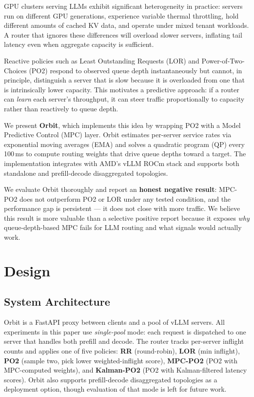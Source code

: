 \documentclass[blind]{gtac}
\begin{document}
GPU clusters serving LLMs exhibit significant heterogeneity in practice:
servers run on different GPU generations, experience variable thermal
throttling, hold different amounts of cached KV data, and operate under
mixed tenant workloads. A router that ignores these differences will
overload slower servers, inflating tail latency even when aggregate capacity
is sufficient.

Reactive policies such as Least Outstanding Requests (LOR) and
Power-of-Two-Choices (PO2) \cite{po2} respond to observed queue depth
instantaneously but cannot, in principle, distinguish a server that is
slow because it is overloaded from one that is intrinsically lower capacity.
This motivates a predictive approach: if a router can \emph{learn} each
server's throughput, it can steer traffic proportionally to capacity rather
than reactively to queue depth.

We present \textbf{Orbit}, which implements this idea by wrapping PO2 with
a Model Predictive Control (MPC) \cite{mpc_book} layer. Orbit estimates
per-server service rates via exponential moving averages (EMA) and solves a
quadratic program (QP) every 100\,ms to compute routing weights that drive
queue depths toward a target. The implementation integrates with AMD's vLLM
ROCm stack and supports both standalone and prefill-decode disaggregated
topologies.

We evaluate Orbit thoroughly and report an \textbf{honest negative result}:
MPC-PO2 does not outperform PO2 or LOR under any tested condition, and
the performance gap is persistent --- it does not close with more traffic.
We believe this result is more valuable than a selective positive report
because it exposes \emph{why} queue-depth-based MPC fails for LLM routing
and what signals would actually work.

\section{Design}

\subsection{System Architecture}

Orbit is a FastAPI proxy between clients and a pool of vLLM servers.
All experiments in this paper use \emph{single-pool} mode: each request
is dispatched to one server that handles both prefill and decode.
The router tracks per-server inflight counts and applies one of five
policies: \textbf{RR} (round-robin), \textbf{LOR} (min inflight),
\textbf{PO2} (sample two, pick lower weighted-inflight score),
\textbf{MPC-PO2} (PO2 with MPC-computed weights), and
\textbf{Kalman-PO2} (PO2 with Kalman-filtered latency scores).
Orbit also supports prefill-decode disaggregated topologies as a
deployment option, though evaluation of that mode is left for future work.
\end{document}
